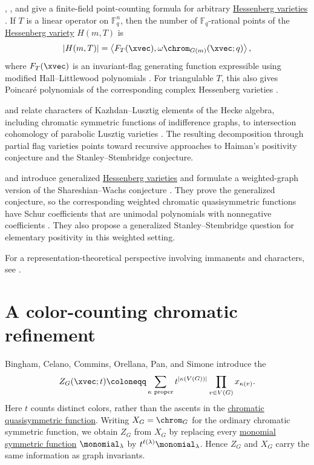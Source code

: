 , , and  give a
finite-field point-counting formula for arbitrary
\hyperref[hessenbergVarietiesBackground]{Hessenberg varieties}
\cite{AbreuNigroRam2024x}.  If $T$ is a linear operator on
$\mathbb{F}_q^n$, then the number of $\mathbb{F}_q$-rational points of the
\hyperref[hessenbergVarietyDefinition]{Hessenberg variety} $H(m,T)$ is
\[
|H(m,T)|
=
\left\langle F_T(\xvec),\omega\chrom_{G(m)}(\xvec;q)\right\rangle,
\]
where $F_T(\xvec)$ is an invariant-flag generating function expressible using
modified Hall--Littlewood polynomials \cite[Thm.~1.1]{AbreuNigroRam2024x}.
For triangulable $T$, this also gives Poincar\'e polynomials of the corresponding
complex Hessenberg varieties \cite[Cor.~3.8]{AbreuNigroRam2024x}.

 and  relate characters of
Kazhdan--Lusztig elements of the Hecke algebra, including chromatic symmetric
functions of indifference graphs, to intersection cohomology of parabolic
Lusztig varieties \cite{AbreuNigro2025Parabolic}.  The resulting
decomposition through partial flag varieties points toward recursive
approaches to Haiman's positivity conjecture and the Stanley--Stembridge
conjecture.

 and  introduce generalized
\hyperref[hessenbergVarietiesBackground]{Hessenberg varieties} and formulate a
weighted-graph version of the
Shareshian--Wachs conjecture \cite{KiemLee2024}.  They prove the
generalized conjecture, so the corresponding weighted chromatic
quasisymmetric functions have Schur coefficients that are unimodal
polynomials with nonnegative coefficients \cite[Thm.~4.6 and
Cor.~4.8]{KiemLee2024}.  They also propose a generalized
Stanley--Stembridge question for elementary positivity in this weighted
setting.


For a representation-theoretical perspective involving immanents and
characters, see \cite{Skandera2020}.


\section[colorCountingChromatic]{A color-counting chromatic refinement}

Bingham, Celano, Commins, Orellana, Pan, and Simone introduce the
\cite{BinghamCelanoComminsOrellanaPanSimone2026x}
\[
 Z_G(\xvec;t)\coloneqq
 \sum_{\kappa\text{ proper}}t^{|\kappa(V(G))|}
       \prod_{v\in V(G)}x_{\kappa(v)}.
\]
Here $t$ counts distinct colors, rather than the ascents in the
\hyperref[chromaticQuasisymmetric]{chromatic quasisymmetric function}.
Writing $X_G=\chrom_G$ for the ordinary chromatic symmetric function,
we obtain $Z_G$ from $X_G$ by replacing every
\hyperref[monomial]{monomial symmetric function} $\monomial_\lambda$ by
$t^{\ell(\lambda)}\monomial_\lambda$. Hence $Z_G$ and $X_G$ carry the
same information as graph invariants.

